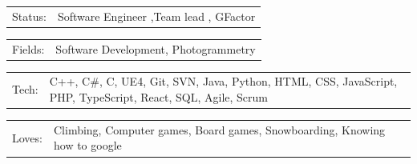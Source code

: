 \documentclass[10pt,A4]{article}
\newcommand{\tzlarrow}{(0,0) -- (0.2,0) -- (0.3,0.2) -- (0.2,0.4) -- (0,0.4) -- (0.1,0.2) -- cycle;}
\newcommand{\larrow}[1]
{\begin{tikzpicture}[scale=0.58]
	 \filldraw[fill=#1!100,draw=#1!100!black]  \tzlarrow
 \end{tikzpicture}
}
\newcommand{\metasection}[2]
{
\begin{tabular*}{1\textwidth}{p{2.4cm} p{15cm}}
\larrow{bgcol}	\normalsize{\textcolor{sectcol}{#1}}&#2\\[12pt]
\end{tabular*}
}
\begin{document}
\pagestyle{fancy}	


\vspace{-20.55pt}


\hspace{-0.25\linewidth}\colorbox{bgcol}{}


%
%


\vspace{10pt}

\metasection{Status:}{Software Engineer ,Team lead , GFactor }
\metasection{Fields:}{Software Development, Photogrammetry} 
\metasection{Tech:}{C++, C\#, C, UE4, Git, SVN, Java, Python, HTML, CSS, JavaScript, PHP, TypeScript, React, SQL, Agile, Scrum}
\metasection{Loves:}{Climbing, Computer games, Board games, Snowboarding, Knowing how to google}
\end{document}

